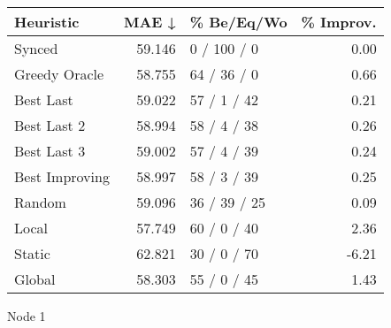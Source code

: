\begin{tabular}{lrlr}
\toprule
\textbf{Heuristic} & \textbf{MAE ↓} & \textbf{\% Be/Eq/Wo} & \textbf{\% Improv.} \\
\midrule
            Synced &         59.146 &          0 / 100 / 0 &                0.00 \\
     Greedy Oracle &         58.755 &          64 / 36 / 0 &                0.66 \\
         Best Last &         59.022 &          57 / 1 / 42 &                0.21 \\
       Best Last 2 &         58.994 &          58 / 4 / 38 &                0.26 \\
       Best Last 3 &         59.002 &          57 / 4 / 39 &                0.24 \\
    Best Improving &         58.997 &          58 / 3 / 39 &                0.25 \\
            Random &         59.096 &         36 / 39 / 25 &                0.09 \\
             Local &         57.749 &          60 / 0 / 40 &                2.36 \\
            Static &         62.821 &          30 / 0 / 70 &               -6.21 \\
            Global &         58.303 &          55 / 0 / 45 &                1.43 \\
\bottomrule
\end{tabular}
\caption{Node 1}
\label{tab:non_lr01_le1_bs2_1}
